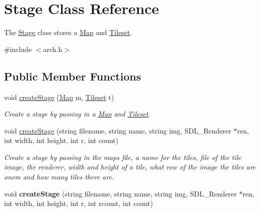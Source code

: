 \hypertarget{classStage}{}\section{Stage Class Reference}
\label{classStage}


The \hyperlink{classStage}{Stage} class stores a \hyperlink{classMap}{Map} and \hyperlink{classTileset}{Tileset}.  




{\ttfamily \#include $<$arch.\+h$>$}

\subsection*{Public Member Functions}
\begin{DoxyCompactItemize}
\item 
void \hyperlink{classStage_a716561c7b2b148b67e7cf4952bae937b}{create\+Stage} (\hyperlink{classMap}{Map} m, \hyperlink{classTileset}{Tileset} t)\hypertarget{classStage_a716561c7b2b148b67e7cf4952bae937b}{}\label{classStage_a716561c7b2b148b67e7cf4952bae937b}

\begin{DoxyCompactList}\small\item\em Create a stage by passing in a \hyperlink{classMap}{Map} and \hyperlink{classTileset}{Tileset}. \end{DoxyCompactList}\item 
void \hyperlink{classStage_ad552bc548e34ff668944a6fc20b2aa0d}{create\+Stage} (string filename, string name, string img, S\+D\+L\+\_\+\+Renderer $\ast$ren, int width, int height, int r, int count)\hypertarget{classStage_ad552bc548e34ff668944a6fc20b2aa0d}{}\label{classStage_ad552bc548e34ff668944a6fc20b2aa0d}

\begin{DoxyCompactList}\small\item\em Create a stage by passing in the maps file, a name for the tiles, file of the tile image, the renderer, width and height of a tile, what row of the image the tiles are onem and how many tiles there are. \end{DoxyCompactList}\item 
void {\bfseries create\+Stage} (string filename, string name, string img, S\+D\+L\+\_\+\+Renderer $\ast$ren, int width, int height, int r, int rcount, int count)\hypertarget{classStage_a871e4913cf2566a1a3a21c9d2e962648}{}\label{classStage_a871e4913cf2566a1a3a21c9d2e962648}


\end{DoxyCompactItemize}
